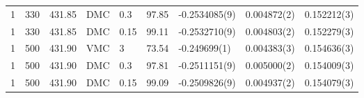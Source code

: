 \begin{tabular}{rrrllllll}
            1 &          330 &                431.85 &    DMC &      0.3 &  97.85 &                         -0.2534085(9) &                     0.004872(2) &                           0.152212(3) \\
            1 &          330 &                431.85 &    DMC &     0.15 &  99.11 &                         -0.2532710(9) &                     0.004803(2) &                           0.152279(3) \\
            1 &          500 &                431.90 &    VMC &        3 &  73.54 &                          -0.249699(1) &                     0.004383(3) &                           0.154636(3) \\
            1 &          500 &                431.90 &    DMC &      0.3 &  97.81 &                         -0.2511151(9) &                     0.005000(2) &                           0.154009(3) \\
            1 &          500 &                431.90 &    DMC &     0.15 &  99.09 &                         -0.2509826(9) &                     0.004937(2) &                           0.154079(3) \\
\bottomrule
\end{tabular}
